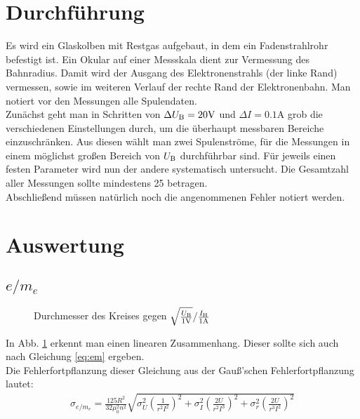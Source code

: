 \documentclass[12pt,a4paper,titlepage,headinclude,bibtotoc]{scrartcl}
\numberwithin{equation}{section}
\begin{document}
\section{Durchführung}
\label{sec:durchfuehrung}
Es wird ein Glaskolben mit Restgas aufgebaut, in dem ein Fadenstrahlrohr befestigt ist.
Ein Okular auf einer Messskala dient zur Vermessung des Bahnradius.
Damit wird der Ausgang des Elektronenstrahls (der linke Rand) vermessen, sowie im weiteren Verlauf der rechte Rand der Elektronenbahn.
Man notiert vor den Messungen alle Spulendaten.\\
Zunächst geht man in Schritten von $\Delta U_\text B=20\si{\volt}$ und $\Delta I=0.1\si{\ampere}$ grob die verschiedenen Einstellungen durch, um die überhaupt messbaren Bereiche einzuschränken.
Aus diesen wählt man zwei Spulenströme, für die Messungen in einem möglichst großen Bereich von $U_\text B$ durchführbar sind.
Für jeweils einen festen Parameter wird nun der andere systematisch untersucht.
Die Gesamtzahl aller Messungen sollte mindestens 25 betragen.\\
Abschließend müssen natürlich noch die angenommenen Fehler notiert werden.




\section{Auswertung}
\label{sec:auswertung}
\subsection{$e/m_e$}
\begin{figure}[!h]
	\centering
	
	\caption{Durchmesser des Kreises gegen $\sqrt{\frac{U_\text{B}}{1\text V}}/\frac{I_\text{H}}{1\text A}$}
	\label{fig:UI}
\end{figure}

In Abb. \ref{fig:UI} erkennt man einen linearen Zusammenhang.
Dieser sollte sich auch nach Gleichung \eqref{eq:em} ergeben.\\
Die Fehlerfortpflanzung dieser Gleichung aus der Gauß'schen Fehlerfortpflanzung lautet:
\begin{align}
\sigma_{e/m_e}=\frac{125R^2}{32\mu_0^{2}n^2}\sqrt{\sigma_{U}^2\left( \frac{1}{r^2I^2} \right)^2+\sigma_I^2\left( \frac{2U}{r^2I^3} \right)^2+\sigma_r^2\left( \frac{2U}{r^3I^2} \right)^2}
\end{align}
\end{document}
